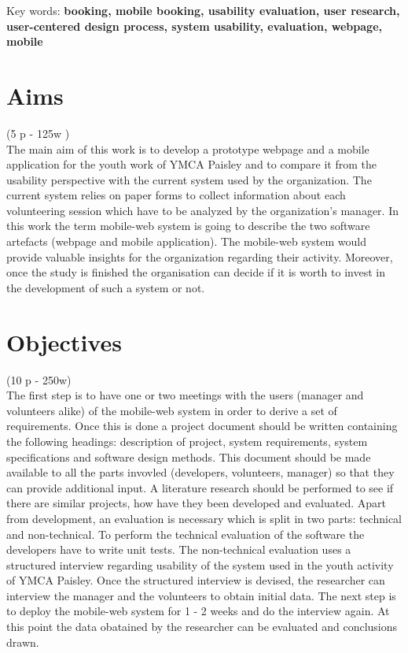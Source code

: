 \documentclass[version=last,fontsize=13pt]{scrartcl}
\begin{document}
Key words: \textbf{booking, mobile booking, usability evaluation, user research, user-centered design process, system usability, evaluation, webpage, mobile}

\newpage
\section{Aims}(5 p - 125w )\\
\indent
The main aim of this work is to develop a prototype webpage and a mobile application for the youth work of YMCA Paisley and to compare it from the usability perspective with the current system used by the organization. The current system  relies on paper forms to collect information about each volunteering session which have to be analyzed by the organization's manager.  In this work the term mobile-web system is going to describe the two software artefacts (webpage and mobile application). The mobile-web system would provide valuable insights for the organization  regarding their activity. Moreover, once the study is finished the organisation can decide if it is worth to invest in the development of such a system  or not. 

\section{Objectives}(10 p - 250w)\\

	The first step is to have one or two meetings with the users (manager and volunteers alike) of the mobile-web system in order to derive a  set of requirements. Once this is done a project document should be written containing the following headings: description of project, system requirements, system specifications and software design methods. This document should be made available to all the parts invovled (developers, volunteers, manager) so that they can provide additional input. A literature research should be performed to see if there are similar projects, how have they been developed and evaluated. Apart from development, an evaluation is necessary which is split in two parts: technical  and non-technical. To perform the technical evaluation of the software the developers have to write unit tests. The non-technical evaluation uses a structured interview regarding usability of the system used in the youth activity of YMCA Paisley. Once the structured interview is devised, the researcher can interview the manager and the volunteers to obtain initial data. The next step is to deploy the mobile-web system for 1 - 2 weeks and do the interview again. At this point the data obatained by the researcher can be evaluated and conclusions drawn.
\end{document}
